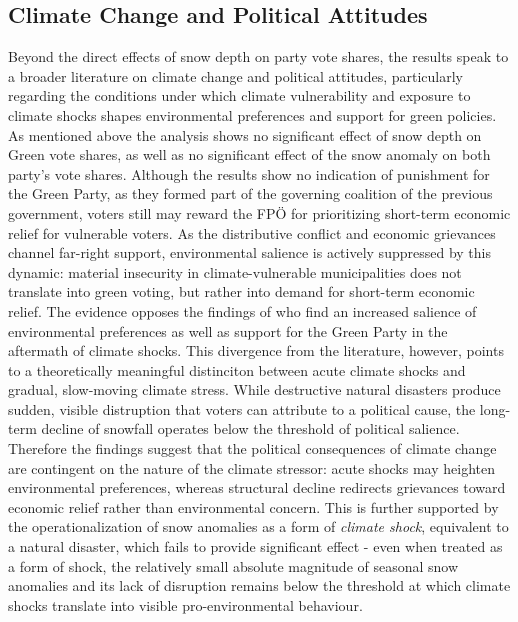 \documentclass{article}
\begin{document}
\subsection{Climate Change and Political Attitudes}
Beyond the direct effects of snow depth on party vote shares, the results speak to a broader literature on climate change and political attitudes, particularly regarding the conditions under which climate vulnerability and exposure to climate shocks shapes environmental preferences and support for green policies. 
As mentioned above the analysis shows no significant effect of snow depth on Green vote shares, as well as no significant effect of the snow anomaly on both party's vote shares. Although the results show no indication of punishment for the Green Party, as they formed part of the governing coalition of the previous government, voters still may reward the FPÖ for prioritizing short-term economic relief for vulnerable voters. As the distributive conflict and economic grievances channel far-right support, environmental salience is actively suppressed by this dynamic: material insecurity in climate-vulnerable municipalities does not translate into green voting, but rather into demand for short-term economic relief. 
The evidence opposes the findings of \textcite{baccini2021, Pink2023} who find an increased salience of environmental preferences as well as support for the Green Party in the aftermath of climate shocks. This divergence from the literature, however, points to a theoretically meaningful distinciton between acute climate shocks and gradual, slow-moving climate stress. While destructive natural disasters produce sudden, visible distruption that voters can attribute to a political cause, the long-term decline of snowfall operates below the threshold of political salience. Therefore the findings suggest that the political consequences of climate change are contingent on the nature of the climate stressor: acute shocks may heighten environmental preferences, whereas structural decline redirects grievances toward economic relief rather than environmental concern. This is further supported by the operationalization of snow anomalies as a form of \textit{climate shock}, equivalent to a natural disaster, which fails to provide significant effect - even when treated as a form of shock, the relatively small absolute magnitude of seasonal snow anomalies and its lack of disruption remains below the threshold at which climate shocks translate into visible pro-environmental behaviour. 
\end{document}
